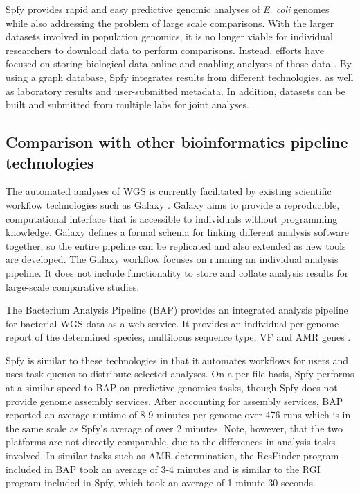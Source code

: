 \documentclass{article}
\begin{document}
Spfy provides rapid and easy predictive genomic analyses of \textit{E. coli} genomes while also addressing the problem of large scale comparisons. With the larger datasets involved in population genomics, it is no longer viable for individual researchers to download data to perform comparisons. Instead, efforts have focused on storing biological data online and enabling analyses of those data \cite{schatz2015biological}. By using a graph database, Spfy integrates results from  different technologies, as well as laboratory results and user-submitted metadata. In addition, datasets can be built and submitted from multiple labs for joint analyses.

\subsection{Comparison with other bioinformatics pipeline technologies}


The automated analyses of WGS is currently facilitated by existing scientific workflow technologies such as Galaxy \cite{goecks2010galaxy}. Galaxy aims to provide a reproducible, computational interface that is accessible to individuals without programming knowledge. Galaxy defines a formal schema for linking different analysis software together, so the entire pipeline can be replicated and also extended as new tools are developed. The Galaxy workflow focuses on running an individual analysis pipeline. It does not include functionality to store and collate analysis results for large-scale comparative studies.

The Bacterium Analysis Pipeline (BAP) \cite{thomsen2016bacterial} provides an integrated analysis pipeline for bacterial WGS data as a web service. It provides an individual per-genome report of the determined species, multilocus sequence type, VF and AMR genes \cite{thomsen2016bacterial}.

Spfy is similar to these technologies in that it automates workflows for users and uses task queues to distribute selected analyses.
On a per file basis, Spfy performs at a similar speed to BAP on predictive genomics tasks, though Spfy does not provide genome assembly services.
After accounting for assembly services, BAP reported \cite{thomsen2016bacterial} an average runtime of 8-9 minutes per genome over 476 runs which is in the same scale as Spfy's average of over 2 minutes.
Note, however, that the two platforms are not directly comparable, due to the differences in analysis tasks involved.
In similar tasks such as AMR determination, the ResFinder program included in BAP took an average of 3-4 minutes \cite{thomsen2016bacterial} and is similar to the RGI program included in Spfy, which took an average of 1 minute 30 seconds.
\end{document}
